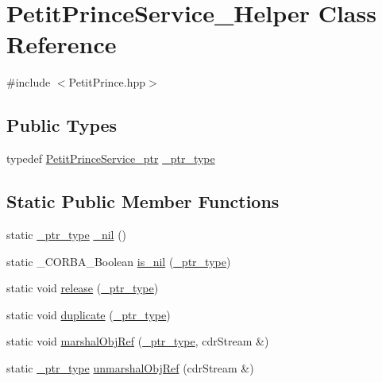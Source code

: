 \hypertarget{class_petit_prince_service___helper}{}\section{Petit\+Prince\+Service\+\_\+\+Helper Class Reference}
\label{class_petit_prince_service___helper}


{\ttfamily \#include $<$Petit\+Prince.\+hpp$>$}

\subsection*{Public Types}
\begin{DoxyCompactItemize}
\item 
typedef \hyperlink{_petit_prince_8hpp_ab3f2faea527950fdeeb9a681c381942f}{Petit\+Prince\+Service\+\_\+ptr} \hyperlink{class_petit_prince_service___helper_a50879af5f5aa618d7dd1266c1e7c5a6e}{\+\_\+ptr\+\_\+type}
\end{DoxyCompactItemize}
\subsection*{Static Public Member Functions}
\begin{DoxyCompactItemize}
\item 
static \hyperlink{class_petit_prince_service___helper_a50879af5f5aa618d7dd1266c1e7c5a6e}{\+\_\+ptr\+\_\+type} \hyperlink{class_petit_prince_service___helper_ab5ece0454c3d2468cc91b45b99d19228}{\+\_\+nil} ()
\item 
static \+\_\+\+C\+O\+R\+B\+A\+\_\+\+Boolean \hyperlink{class_petit_prince_service___helper_ac9ea533aea548832aa7b201669f5748d}{is\+\_\+nil} (\hyperlink{class_petit_prince_service___helper_a50879af5f5aa618d7dd1266c1e7c5a6e}{\+\_\+ptr\+\_\+type})
\item 
static void \hyperlink{class_petit_prince_service___helper_a6b594cf1f53652a77afeb21520b18632}{release} (\hyperlink{class_petit_prince_service___helper_a50879af5f5aa618d7dd1266c1e7c5a6e}{\+\_\+ptr\+\_\+type})
\item 
static void \hyperlink{class_petit_prince_service___helper_a07d9a5bcf2314fc4f26ac935a9f2e81a}{duplicate} (\hyperlink{class_petit_prince_service___helper_a50879af5f5aa618d7dd1266c1e7c5a6e}{\+\_\+ptr\+\_\+type})
\item 
static void \hyperlink{class_petit_prince_service___helper_aa014f99aa3b64f21aa68f7b11972f62f}{marshal\+Obj\+Ref} (\hyperlink{class_petit_prince_service___helper_a50879af5f5aa618d7dd1266c1e7c5a6e}{\+\_\+ptr\+\_\+type}, cdr\+Stream \&)
\item 
static \hyperlink{class_petit_prince_service___helper_a50879af5f5aa618d7dd1266c1e7c5a6e}{\+\_\+ptr\+\_\+type} \hyperlink{class_petit_prince_service___helper_acb3025177d01c66bf1f18e40b505edeb}{unmarshal\+Obj\+Ref} (cdr\+Stream \&)
\end{DoxyCompactItemize}


